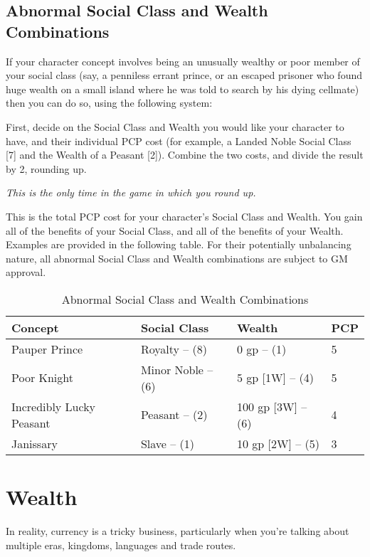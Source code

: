 \documentclass[oneside,11pt,english]{book}
\begin{document}
\subsection{Abnormal Social Class and Wealth Combinations}
If your character concept involves being an unusually wealthy or poor member of
your social class (say, a penniless errant prince, or an escaped prisoner who
found huge wealth on a small island where he was told to search by his dying
cellmate) then you can do so, using the following system:

First, decide on the Social Class and Wealth you would like your character to
have, and their individual PCP cost (for example, a Landed Noble Social Class
[7] and the Wealth of a Peasant [2]). Combine the two costs, and divide the
result by 2, rounding up.  

\emph{This is the only time in the game in which you round up.}

This is the total PCP cost for your character’s Social Class and Wealth. You
gain all of the benefits of your Social Class, and all of the benefits of your
Wealth. Examples are provided in the following table. For their potentially
unbalancing nature, all abnormal Social Class and Wealth combinations are
subject to GM approval. 

\begin{table}[ht]
  \centering
  \caption{Abnormal Social Class and Wealth Combinations}
  \label{tab;Abnormal Class/Wealth Combinations}
  \begin{tabu} spread 0pt {X[l]X[R]X[R]X[-1,c]}
    Concept                  & Social Class       & Wealth             & PCP \\\toprule
    Pauper Prince            & Royalty -- (8)     & 0 gp -- (1)        & 5   \\
    Poor Knight              & Minor Noble -- (6)	& 5 gp [1W] -- (4)   & 5   \\
    Incredibly Lucky Peasant & Peasant -- (2)     & 100 gp [3W] -- (6) & 4   \\
    Janissary                & Slave -- (1)       & 10 gp [2W] -- (5)  & 3   \\
  \end{tabu}
\end{table}

\section{Wealth}
In reality, currency is a tricky business, particularly when you're talking about multiple eras, kingdoms, 
languages and trade routes.
\end{document}
